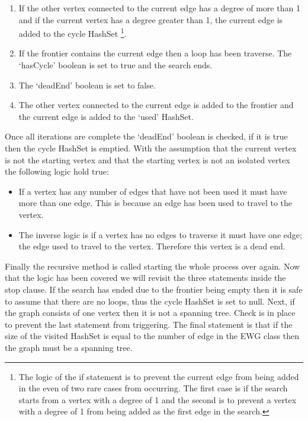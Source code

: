 \documentclass{AISB2008}
\begin{document}
{\begin{enumerate}
\item If the other vertex connected to the current edge has a degree of more than 1 and if the current vertex has a degree greater than 1, the current edge is added to the cycle HashSet \footnote{The logic of the if statement is to prevent the current edge from being added in the even of two rare cases from occurring. The first case is if the search starts from a vertex with a degree of 1 and the second is to prevent a vertex with a degree of 1 from being added as the first edge in the search.}.
\item If the frontier contains the current edge then a loop has been traverse. The ‘hasCycle’ boolean is set to true and the search ends.
\item The ‘deadEnd’ boolean is set to false.
\item The other vertex connected to the current edge is added to the frontier and the current edge is added to the ‘used’ HashSet.
\end{enumerate}

Once all iterations are complete the ‘deadEnd’ boolean is checked, if it is true then the cycle HashSet is emptied. With the assumption that the current vertex is not the starting vertex and that the starting vertex is not an isolated vertex the following logic hold true:

\begin{itemize}
\item If a vertex has any number of edges that have not been used it must have more than one edge. This is because an edge has been used to travel to the vertex.
\item The inverse logic is if a vertex has no edges to traverse it must have one edge; the edge used to travel to the vertex. Therefore this vertex is a dead end.
\end{itemize}

Finally the recursive method is called starting the whole process over again. Now that the logic has been covered we will revisit the three statements inside the stop clause. If the search has ended due to the frontier being empty then it is safe to assume that there are no loops, thus the cycle HashSet is set to null. Next, if the graph consists of one vertex then it is not a spanning tree. Check is in place to prevent the last statement from triggering. The final statement is that if the size of the visited HashSet is equal to the number of edge in the EWG class then the graph must be a spanning tree.


}
\end{document}
